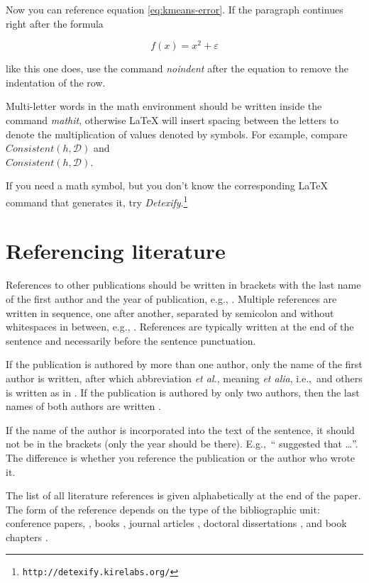 \documentclass[10pt, a4paper]{article}
\begin{document}
Now you can reference equation \eqref{eq:kmeans-error}. If the paragraph continues right after the formula

\begin{equation}
f(x) = x^2 + \varepsilon
\end{equation}

\noindent like this one does, use the command \emph{noindent} after the equation to remove the indentation of the row.

Multi-letter words in the math environment should be written inside the command \emph{mathit}, otherwise \LaTeX{} will insert spacing between the letters to denote the multiplication of values denoted by symbols. For example, compare
$\mathit{Consistent}(h,\mathcal{D})$ and\\
$Consistent(h,\mathcal{D})$.

If you need a math symbol, but you don't know the corresponding \LaTeX{} command that generates it, try
\emph{Detexify}.\footnote{\texttt{http://detexify.kirelabs.org/}}

\section{Referencing literature}

References to other publications should be written in brackets with the last name of the first author and the year of publication, e.g., \citep{chomsky-73}.  Multiple references are written in sequence, one after another, separated by semicolon and without whitespaces in between, e.g., \citep{chomsky-73,chave-64,feigl-58}. References are typically written at the end of the sentence and necessarily before the sentence punctuation.

If the publication is authored by more than one author, only the name of the first author is written, after which abbreviation \emph{et al.}, meaning \emph{et alia}, i.e.,~and others is written as in \citep{johnson-etc}. If the publication is authored by only two authors, then the last names of both authors are written \citep{johnson-howells}.

If the name of the author is incorporated into the text of the sentence, it should not be in the brackets (only the year should be there). E.g.,~``\citet{chomsky-73}
suggested that \dots''. The difference is whether you reference the publication or the author who wrote it.

The list of all literature references is given alphabetically at the end of the paper. The form of the reference depends on the type of the bibliographic unit: conference papers,
\citep{chave-64}, books \citep{butcher-81}, journal articles
\citep{howells-51}, doctoral dissertations \citep{croft-78}, and book chapters \citep{feigl-58}.
\end{document}
